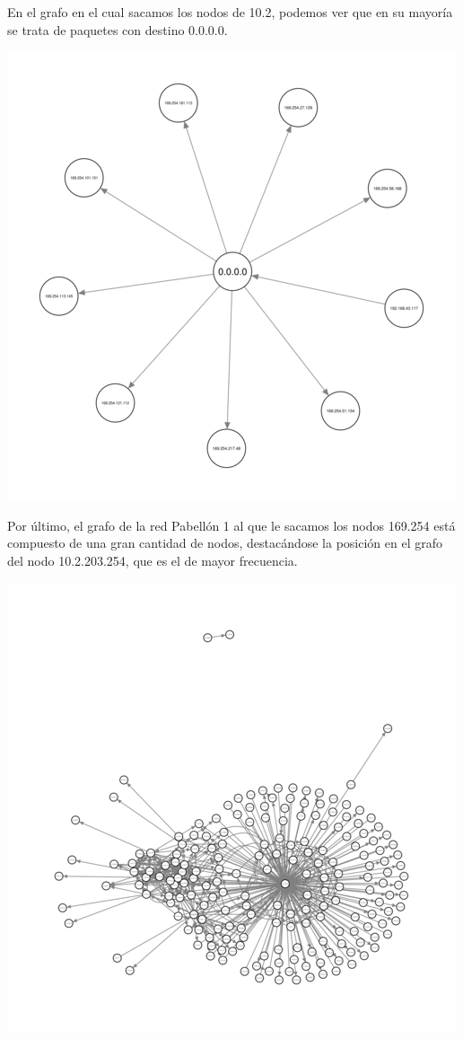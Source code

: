 En el grafo en el cual sacamos los nodos de 10.2, podemos ver que
en su mayoría se trata de paquetes con destino 0.0.0.0.

\begin{center}
\includegraphics[scale=0.5]{../img/exactas-sin10-2.png}
\end{center}

Por último, el grafo de la red Pabellón 1 al que le sacamos los nodos
169.254 está compuesto de una gran cantidad de nodos, destacándose
la posición en el grafo del nodo 10.2.203.254, que es el de mayor
frecuencia.

\begin{center}
\includegraphics{../img/exactas-sin169.png}
\end{center}
